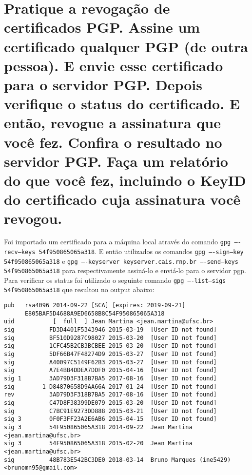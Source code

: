 \documentclass[
    article,            %
    11pt,               %
    oneside,            %
    a4paper,            %
    english,            %
    brazil,             %
    sumario=tradicional,
    ]{abntex2}
\begin{document}
\section{Pratique a revogação de certificados PGP. Assine um certificado qualquer PGP (de outra pessoa). E envie esse certificado para o servidor PGP. Depois verifique o status do certificado. E então, revogue a assinatura que você fez. Confira o resultado no servidor PGP. Faça um relatório do que você fez, incluindo o KeyID do certificado cuja assinatura você revogou.}

Foi importado um certificado para a máquina local através do comando \texttt{gpg ----recv--keys 54f950865065a318}. E então utilizados os comandos \texttt{gpg ----sign--key 54f950865065a318} e \texttt{gpg ----keyserver keyserver.cais.rnp.br ----send--keys 54f950865065a318} para respectivamente assiná-lo e enviá-lo para o servidor pgp. Para verificar os status foi utilizado o seguinte comando \texttt{gpg ----list--sigs 54f950865065a318} que resultou no output abaixo:

\begin{Verbatim}[frame=single, commandchars=\\\{\}, fontsize=\footnotesize]
pub   rsa4096 2014-09-22 [SCA] [expires: 2019-09-21]
      E805BAF5D4688A9ED6658B8C54F950865065A318
uid           [  full  ] Jean Martina <jean.martina@ufsc.br>
sig          FD3D4401F5343946 2015-03-19  [User ID not found]
sig          BF510D9287C98027 2015-03-20  [User ID not found]
sig          1CFC45B2CB3BCBEE 2015-03-20  [User ID not found]
sig          5DF66B47F48274D9 2015-03-27  [User ID not found]
sig          A40097C5149F62B3 2015-03-27  [User ID not found]
sig          A7E4BB4DDEA7DDF0 2015-04-16  [User ID not found]
sig 1        3AD79D3F318B7BA5 2017-08-16  [User ID not found]
sig        1 D84870658D9AA66A 2017-01-24  [User ID not found]
rev          3AD79D3F318B7BA5 2017-08-16  [User ID not found]
sig          C47D8F38399DE079 2015-03-20  [User ID not found]
sig          C7BC91E9273DD888 2015-03-21  [User ID not found]
sig 3        0F0F3FF23A2E6AB6 2015-04-15  [User ID not found]
sig 3        54F950865065A318 2014-09-22  Jean Martina <jean.martina@ufsc.br>
sig 3        54F950865065A318 2015-02-20  Jean Martina <jean.martina@ufsc.br>
sig          48B783E542BC3DE0 2018-03-14  Bruno Marques (ine5429) <brunomn95@gmail.com>
\end{Verbatim}
\end{document}
